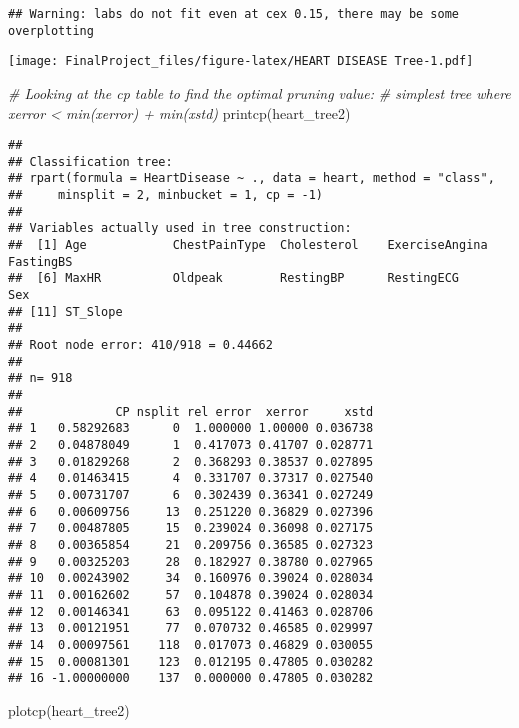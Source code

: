 \documentclass[
]{article}
\newenvironment{Shaded}{\begin{snugshade}}{\end{snugshade}}
\newcommand{\CommentTok}[1]{\textcolor[rgb]{0.56,0.35,0.01}{\textit{#1}}}
\newcommand{\FunctionTok}[1]{\textcolor[rgb]{0.00,0.00,0.00}{#1}}
\newcommand{\NormalTok}[1]{#1}
\begin{document}
\begin{verbatim}
## Warning: labs do not fit even at cex 0.15, there may be some overplotting
\end{verbatim}

\texttt{[image: FinalProject\_files/figure-latex/HEART DISEASE Tree-1.pdf]}

\begin{Shaded}
\begin{Highlighting}[]
\CommentTok{\# Looking at the cp table to find the optimal pruning value:}
\CommentTok{\# simplest tree where xerror \textless{} min(xerror) + min(xstd)}
\FunctionTok{printcp}\NormalTok{(heart\_tree2)}
\end{Highlighting}
\end{Shaded}

\begin{verbatim}
## 
## Classification tree:
## rpart(formula = HeartDisease ~ ., data = heart, method = "class", 
##     minsplit = 2, minbucket = 1, cp = -1)
## 
## Variables actually used in tree construction:
##  [1] Age            ChestPainType  Cholesterol    ExerciseAngina FastingBS     
##  [6] MaxHR          Oldpeak        RestingBP      RestingECG     Sex           
## [11] ST_Slope      
## 
## Root node error: 410/918 = 0.44662
## 
## n= 918 
## 
##             CP nsplit rel error  xerror     xstd
## 1   0.58292683      0  1.000000 1.00000 0.036738
## 2   0.04878049      1  0.417073 0.41707 0.028771
## 3   0.01829268      2  0.368293 0.38537 0.027895
## 4   0.01463415      4  0.331707 0.37317 0.027540
## 5   0.00731707      6  0.302439 0.36341 0.027249
## 6   0.00609756     13  0.251220 0.36829 0.027396
## 7   0.00487805     15  0.239024 0.36098 0.027175
## 8   0.00365854     21  0.209756 0.36585 0.027323
## 9   0.00325203     28  0.182927 0.38780 0.027965
## 10  0.00243902     34  0.160976 0.39024 0.028034
## 11  0.00162602     57  0.104878 0.39024 0.028034
## 12  0.00146341     63  0.095122 0.41463 0.028706
## 13  0.00121951     77  0.070732 0.46585 0.029997
## 14  0.00097561    118  0.017073 0.46829 0.030055
## 15  0.00081301    123  0.012195 0.47805 0.030282
## 16 -1.00000000    137  0.000000 0.47805 0.030282
\end{verbatim}

\begin{Shaded}
\begin{Highlighting}[]
\FunctionTok{plotcp}\NormalTok{(heart\_tree2)}
\end{Highlighting}
\end{Shaded}
\end{document}
